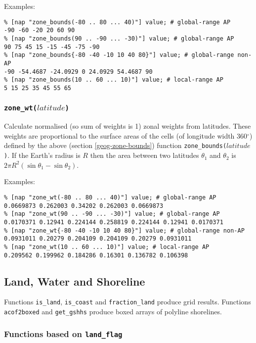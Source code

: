  Examples:
  \begin{verbatim}
% [nap "zone_bounds(-80 .. 80 ... 40)"] value; # global-range AP
-90 -60 -20 20 60 90
% [nap "zone_bounds(90 .. -90 ... -30)"] value; # global-range AP
90 75 45 15 -15 -45 -75 -90
% [nap "zone_bounds{-80 -40 -10 10 40 80}"] value; # global-range non-AP
-90 -54.4687 -24.0929 0 24.0929 54.4687 90
% [nap "zone_bounds(10 .. 60 ... 10)"] value; # local-range AP
5 15 25 35 45 55 65
\end{verbatim}

\subsubsection{\texttt{zone\_wt(}$latitude$\texttt{)}}
    \label{geog-zone-wt}

Calculate normalised (so sum of weights is 1) zonal weights from latitudes.
These weights are proportional to the surface areas of the
  cells (of longitude width 360$^{\circ}$) defined by the above 
(section  \ref{geog-zone-bounds})
function 
\texttt{zone\_bounds(}$latitude$\texttt{)}.
If the Earth's radius is 
  $R$ then the area between two latitudes 
  $\theta_1$ and 
  $\theta_2$ is 
  $2\pi R^2(\sin{\theta_1} - \sin{\theta_2})$.
  
 Examples:
  \begin{verbatim}
% [nap "zone_wt(-80 .. 80 ... 40)"] value; # global-range AP
0.0669873 0.262003 0.34202 0.262003 0.0669873
% [nap "zone_wt(90 .. -90 ... -30)"] value; # global-range AP
0.0170371 0.12941 0.224144 0.258819 0.224144 0.12941 0.0170371
% [nap "zone_wt{-80 -40 -10 10 40 80}"] value; # global-range non-AP
0.0931011 0.20279 0.204109 0.204109 0.20279 0.0931011
% [nap "zone_wt(10 .. 60 ... 10)"] value; # local-range AP
0.209562 0.199962 0.184286 0.16301 0.136782 0.106398
\end{verbatim}

\subsection{Land, Water and Shoreline}
    \label{geog-land}

Functions \texttt{is\_land}, \texttt{is\_coast} and \texttt{fraction\_land} produce grid results.
Functions \texttt{acof2boxed} and \texttt{get\_gshhs} produce boxed arrays of polyline shorelines.

\subsubsection{Functions based on \texttt{land\_flag}}
\label{land-flag-functions}

